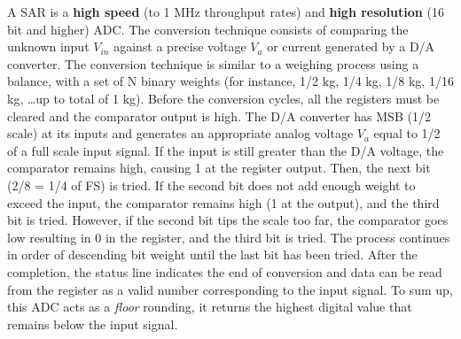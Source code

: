 A SAR is a \textbf{high speed} (to
1 MHz throughput rates) and \textbf{high resolution} (16 bit and higher) ADC.
The conversion technique consists of comparing the unknown input $ V_{in}$ against
a precise voltage $V_a$ or current generated by a D/A converter. The conversion
technique is similar to a weighing process using a balance, with a set of N binary
weights (for instance, 1/2 kg, 1/4 kg, 1/8 kg, 1/16 kg, \dots up to total of 1 kg). Before
the conversion cycles, all the registers must be cleared and the comparator output
is high. The D/A converter has MSB (1/2 scale) at its inputs and generates an appropriate analog voltage $V_a$ equal to 1/2 of a full scale input signal. If the input is
still greater than the D/A voltage, the comparator remains high,
causing 1 at the register output. Then, the next bit (2/8 = 1/4 of FS) is tried.
If the second bit does not add enough weight to exceed the input, the comparator
remains high (1 at the output), and the third bit is tried. However, if the second
bit tips the scale too far, the comparator goes low resulting in 0 in the register,
and the third bit is tried. The process continues in order of descending bit weight
until the last bit has been tried. After the completion, the status line indicates the
end of conversion and data can be read from the register as a valid number
corresponding to the input signal. To sum up, this ADC acts as a \textit{floor} rounding, it returns the highest digital value that remains below the input signal.

